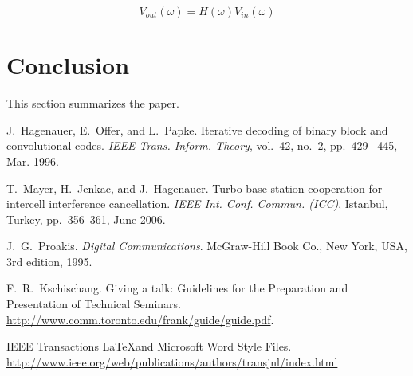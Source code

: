 \documentclass[journal, a4paper]{IEEEtran}
\begin{document}
\begin{equation}
V_{out}(\omega)= H(\omega)V_{in}(\omega)
\end{equation}

\section{Conclusion}
	This section summarizes the paper.

\begin{thebibliography}{5}

	J.~Hagenauer, E.~Offer, and L.~Papke. Iterative decoding of binary block
	and convolutional codes. {\em IEEE Trans. Inform. Theory},
	vol.~42, no.~2, pp.~429–-445, Mar. 1996.

	T.~Mayer, H.~Jenkac, and J.~Hagenauer. Turbo base-station cooperation for intercell interference cancellation. {\em IEEE Int. Conf. Commun. (ICC)}, Istanbul, Turkey, pp.~356--361, June 2006.

	J.~G.~Proakis. {\em Digital Communications}. McGraw-Hill Book Co.,
	New York, USA, 3rd edition, 1995.

	F.~R.~Kschischang. Giving a talk: Guidelines for the Preparation and Presentation of Technical Seminars.
	\url{http://www.comm.toronto.edu/frank/guide/guide.pdf}.

	IEEE Transactions \LaTeX and Microsoft Word Style Files.
	\url{http://www.ieee.org/web/publications/authors/transjnl/index.html}

\end{thebibliography}

\end{document}
